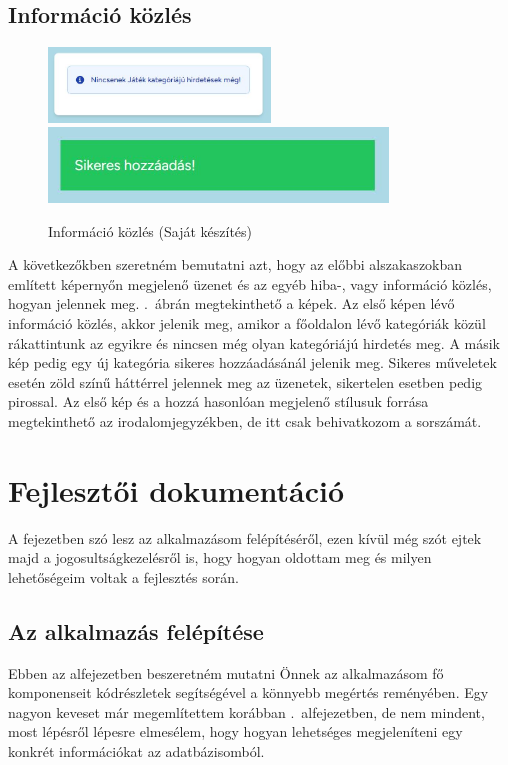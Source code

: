 \documentclass[]{thesis-ekf}
\theoremstyle{definition}
\theoremstyle{remark}
\begin{document}
	\section{Információ közlés}
		\begin{figure}[ht!]
			\centering
			\includegraphics[height=2cm]{./felhasznaloi/kategoriaUzenet}
			\includegraphics[height=2cm]{./felhasznaloi/kategoria2}
			\caption{Információ közlés (Saját készítés)} 
			\label{informaciokozles}
		\end{figure}
		A következőkben szeretném bemutatni azt, hogy az előbbi alszakaszokban említett képernyőn megjelenő üzenet és az egyéb hiba-, vagy információ közlés, hogyan jelennek meg. .~ábrán megtekinthető a képek. Az első képen lévő információ közlés, akkor jelenik meg, amikor a főoldalon lévő kategóriák közül rákattintunk az egyikre és nincsen még olyan kategóriájú hirdetés meg. A másik kép pedig egy új kategória sikeres hozzáadásánál jelenik meg. Sikeres műveletek esetén zöld színű háttérrel jelennek meg az üzenetek, sikertelen esetben pedig pirossal. Az első kép és a hozzá hasonlóan megjelenő stílusuk forrása megtekinthető az irodalomjegyzékben, de itt csak behivatkozom a sorszámát. \cite{FlowBite}
	
	\chapter{Fejlesztői dokumentáció}
		A fejezetben szó lesz az alkalmazásom felépítéséről, ezen kívül még szót ejtek majd a jogosultságkezelésről is, hogy hogyan oldottam meg és milyen lehetőségeim voltak a fejlesztés során.
	\section{Az alkalmazás felépítése}
		Ebben az alfejezetben beszeretném mutatni Önnek az alkalmazásom fő komponenseit kódrészletek segítségével a könnyebb megértés reményében. Egy nagyon keveset már megemlítettem korábban .~alfejezetben, de nem mindent, most lépésről lépesre elmesélem, hogy hogyan lehetséges megjeleníteni egy konkrét információkat az adatbázisomból.
\end{document}
